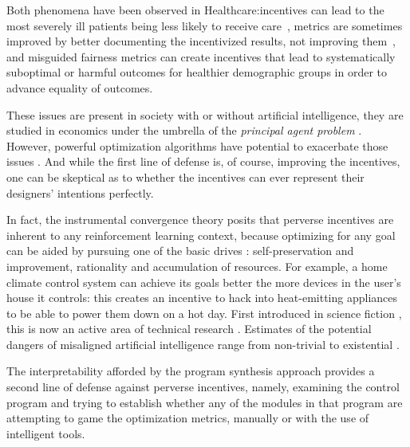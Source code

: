 Both phenomena have been observed in Healthcare:incentives can lead to the most severely ill patients being less likely to receive care~\cite{shenSelectionIncentivesPerformancebased2003}, metrics are sometimes improved by better documenting the incentivized results, not improving them~\cite{fairbrotherImpactFinancialIncentives2001,fairbrotherImpactPhysicianBonuses1999,roskiImpactFinancialIncentives2003}, and misguided fairness metrics \cite{longFairnessMachineLearning2021} can create incentives that lead to systematically suboptimal or harmful outcomes for healthier demographic groups in order to advance equality of outcomes.

These issues are present in society \cite{nestianPerverseIncentiveGeneral2017} with or without artificial intelligence, they are studied in economics under the umbrella of the \emph{principal agent problem} \cite{pandaAgencyTheoryReview2017}. 
However, powerful optimization algorithms have potential to exacerbate those issues \cite{hadfield-menellIncompleteContractingAI2019}. 
And while the first line of defense is, of course, improving the incentives, one can be skeptical as to whether the incentives can ever represent their designers' intentions perfectly.

In fact, the instrumental convergence theory \cite{benson-tilsenFormalizingConvergentInstrumental,bostromSuperintelligencePathsDangers2016} posits that perverse incentives are inherent to any reinforcement learning context, because optimizing for any goal can be aided by pursuing one of the basic drives \cite{omohundroBasicAIDrives2018}: self-preservation and improvement, rationality and accumulation of resources.
For example, a home climate control system can achieve its goals better the more devices in the user's house it controls: this creates an incentive to hack into heat-emitting appliances to be able to power them down on a hot day.
First introduced in science fiction \cite{clarke2001SpaceOdyssey2016,ellisonHaveNoMouth1967,jonesColossus2019}, this is now an active area of technical research \cite{jiAIAlignmentComprehensive2024}.
Estimates of the potential dangers of misaligned artificial intelligence range from non-trivial to existential \cite{mcleanRisksAssociatedArtificial2023}.

The interpretability afforded by the program synthesis approach provides a second line of defense against perverse incentives, namely, examining the control program and trying to establish whether any of the modules in that program are attempting to game the optimization metrics, manually or with the use of intelligent tools.

